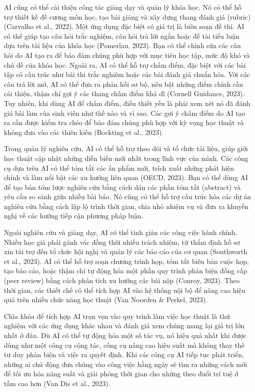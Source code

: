 AI cũng có thể cải thiện công tác giảng dạy và quản lý khóa học. Nó có thể hỗ trợ thiết kế đề cương môn học, tạo bài giảng và xây dựng thang đánh giá (rubric) (Carvalho et al., 2022). Một ứng dụng đặc biệt có giá trị là biên soạn đề thi. AI có thể giúp tạo câu hỏi trắc nghiệm, câu hỏi trả lời ngắn hoặc đề tài tiểu luận dựa trên tài liệu của khóa học (Pomerlau, 2023). Bạn có thể chỉnh sửa các câu hỏi do AI tạo ra để bảo đảm chúng phù hợp với mục tiêu học tập, mức độ khó và chủ đề của khóa học. Ngoài ra, AI có thể hỗ trợ chấm điểm, đặc biệt với các bài tập có cấu trúc như bài thi trắc nghiệm hoặc các bài đánh giá chuẩn hóa. Với các câu trả lời mở, AI có thể đưa ra phản hồi sơ bộ, nêu bật những điểm chính cần cải thiện, thậm chí gợi ý các thang chấm điểm khả dĩ (Cornell Guidance, 2023). Tuy nhiên, khi dùng AI để chấm điểm, điều thiết yếu là phải xem xét nó đã đánh giá bài làm của sinh viên như thế nào và vì sao. Các gợi ý chấm điểm do AI tạo ra cần được kiểm tra chéo để bảo đảm chúng phù hợp với kỳ vọng học thuật và không đưa vào các thiên kiến (Bockting et al., 2023).

Trong quản lý nghiên cứu, AI có thể hỗ trợ theo dõi và tổ chức tài liệu, giúp giới học thuật cập nhật những diễn biến mới nhất trong lĩnh vực của mình. Các công cụ dựa trên AI có thể tóm tắt các ấn phẩm mới, trích xuất những phát hiện chính và làm nổi bật các xu hướng liên quan (OECD, 2023). Bạn có thể dùng AI để tạo bản tóm lược nghiên cứu bằng cách dán các phần tóm tắt (abstract) và yêu cầu so sánh giữa nhiều bài báo. Nó cũng có thể hỗ trợ cấu trúc hóa các dự án nghiên cứu bằng cách lập lộ trình thời gian, chia nhỏ nhiệm vụ và đưa ra khuyến nghị về các hướng tiếp cận phương pháp luận.

Ngoài nghiên cứu và giảng dạy, AI có thể tinh giản các công việc hành chính. Nhiều học giả phải gánh vác đồng thời nhiều trách nhiệm, từ thẩm định hồ sơ xin tài trợ đến tổ chức hội nghị và quản lý các báo cáo của cơ quan (Southworth et al., 2023). AI có thể hỗ trợ soạn chương trình họp, tóm tắt biên bản cuộc họp, tạo báo cáo, hoặc thậm chí tự động hóa một phần quy trình phản biện đồng cấp (peer review) bằng cách phân tích xu hướng các bài nộp (Conroy, 2023). Theo thời gian, các thiết chế có thể tích hợp AI vào hệ thống nội bộ để nâng cao hiệu quả trên nhiều chức năng học thuật (Van Noorden \& Perkel, 2023).

Chìa khóa để tích hợp AI trọn vẹn vào quy trình làm việc học thuật là thử nghiệm với các ứng dụng khác nhau và đánh giá xem chúng mang lại giá trị lớn nhất ở đâu. Dù AI có thể tự động hóa một số tác vụ, nó hiệu quả nhất khi được dùng như một công cụ cộng tác, công cụ nâng cao hiệu suất mà không thay thế tư duy phản biện và việc ra quyết định. Khi các công cụ AI tiếp tục phát triển, những ai chủ động đưa chúng vào công việc hằng ngày sẽ tìm ra những cách mới để tối ưu hóa năng suất và giải phóng thời gian cho những theo đuổi trí tuệ ở tầm cao hơn (Van Dis et al., 2023).

